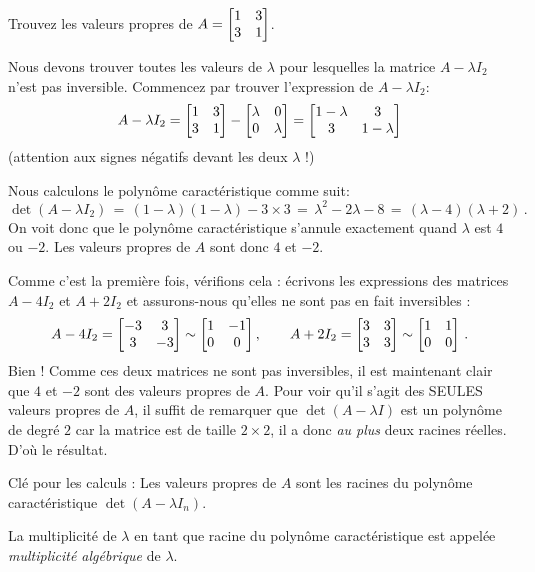 \begin{myprob}
Trouvez les valeurs propres de $A = \left[ \begin{matrix} 1 & 3 \\ 3 & 1 \end{matrix} \right]$.

\begin{mysol}
Nous devons trouver toutes les valeurs de $\lambda$ pour lesquelles la matrice $A-\lambda I_2$ n'est
pas inversible.  Commencez par trouver l'expression de $A-\lambda I_2 $:
$$
A-\lambda I_2 = \left[ \begin{matrix} 1 & 3 \\ 3 & 1 \end{matrix} \right] -\left[ \begin{matrix} \lambda & 0 \\ 0 & \lambda \end{matrix} \right]
= \left[ \begin{matrix}   1-\lambda & 3\\ 3 &   1-\lambda \end{matrix} \right]
$$
(attention aux signes négatifs devant les deux $\lambda$ !)

Nous calculons le polynôme caractéristique comme suit:
$$
\det(A-\lambda I_2) \,=\, (1-\lambda)(1-\lambda) - 3\times 3  \,=\, \lambda^2 -2\lambda -8
 \,=\, (\lambda - 4)(\lambda + 2)\,.
$$
On voit donc que le polyn\^ome caract\'eristique s'annule exactement quand $\lambda$ est $4$ ou $-2$.
Les valeurs propres de $A$ sont donc $4$ et $-2$.  

Comme c'est la première fois, vérifions cela : écrivons les expressions des matrices $A-4I_2$ et $A+2I_2$ et assurons-nous qu'elles ne sont pas en fait inversibles :
$$
A-4I_2 = \left[ \begin{matrix} -3&3\\3&-3 \end{matrix} \right]\sim \left[ \begin{matrix} 1&-1\\0&0 \end{matrix} \right], \qquad A+2I_2 = \left[ \begin{matrix} 3&3\\3&3 \end{matrix} \right]\sim \left[ \begin{matrix} 1&1\\0&0 \end{matrix} \right]\,.
$$
Bien ! Comme ces deux matrices ne sont pas inversibles, il est maintenant clair que $4$ et $-2$ sont des valeurs propres de $A$. 
Pour voir qu'il s'agit des SEULES valeurs propres de $A$, il suffit de remarquer que $\det(A-\lambda I)$ est un polynôme de degré $2$ car la matrice est de taille $2\times 2$, il a donc {\it au plus} deux racines réelles. D'où le résultat.

 
\end{mysol}\end{myprob}

Clé pour les calculs :
Les valeurs propres de $A$ sont les racines du polynôme caractéristique 
$\det( A-\lambda I_n )$.  

\begin{definition}\label{def:algmult}
La multiplicité de $\lambda$ en tant que racine du polynôme caractéristique
est appelée \emph{multiplicité algébrique} de $\lambda$.
\end{definition}
 
